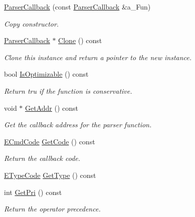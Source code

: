 \begin{DoxyCompactItemize}
\hyperlink{classmu_1_1_parser_callback_a689eab6da426078ed50e2794865f8cf9}{Parser\+Callback} (const \hyperlink{classmu_1_1_parser_callback}{Parser\+Callback} \&a\+\_\+\+Fun)
\begin{DoxyCompactList}\small\item\em Copy constructor. \end{DoxyCompactList}\item 
\hyperlink{classmu_1_1_parser_callback}{Parser\+Callback} $\ast$ \hyperlink{classmu_1_1_parser_callback_aa78005daec4187a7843871911585629e}{Clone} () const 
\begin{DoxyCompactList}\small\item\em Clone this instance and return a pointer to the new instance. \end{DoxyCompactList}\item 
bool \hyperlink{classmu_1_1_parser_callback_ab899146ccc02b1a7a7245694821ba618}{Is\+Optimizable} () const 
\begin{DoxyCompactList}\small\item\em Return tru if the function is conservative. \end{DoxyCompactList}\item 
void $\ast$ \hyperlink{classmu_1_1_parser_callback_a509c3106a4adea192e3f8044898e18a7}{Get\+Addr} () const 
\begin{DoxyCompactList}\small\item\em Get the callback address for the parser function. \end{DoxyCompactList}\item 
\hyperlink{namespacemu_ab77181e591bebd278bf9c7a2e30ad40e}{E\+Cmd\+Code} \hyperlink{classmu_1_1_parser_callback_a8aba600cfcc29227674ec367f6dca6dd}{Get\+Code} () const 
\begin{DoxyCompactList}\small\item\em Return the callback code. \end{DoxyCompactList}\item 
\hyperlink{namespacemu_ac3ccf6a749baacffd48fe97b9c2af302}{E\+Type\+Code} \hyperlink{classmu_1_1_parser_callback_a6744d48241d12c0643141764184bb373}{Get\+Type} () const 
\item 
int \hyperlink{classmu_1_1_parser_callback_a09b1100b5b0f69b6258a0412ad0f108e}{Get\+Pri} () const 
\begin{DoxyCompactList}\small\item\em Return the operator precedence. \end{DoxyCompactList}\item 

\end{DoxyCompactItemize}
